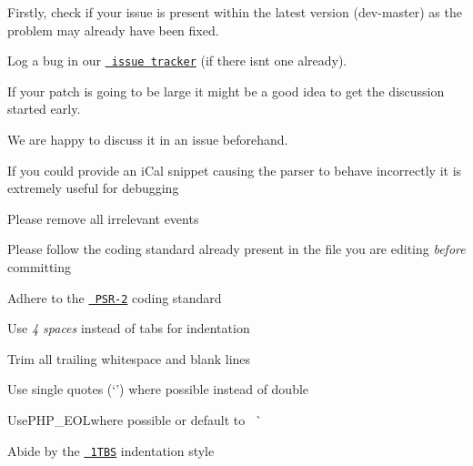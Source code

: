 \begin{DoxyEnumerate}
\item Firstly, check if your issue is present within the latest version ({\ttfamily dev-\/master}) as the problem may already have been fixed.
\end{DoxyEnumerate}
\begin{DoxyEnumerate}
\item Log a bug in our \href{https://github.com/u01jmg3/ics-parser/issues}{\texttt{ issue tracker}} (if there isn\textquotesingle{}t one already).
\begin{DoxyItemize}
\item If your patch is going to be large it might be a good idea to get the discussion started early.
\begin{DoxyItemize}
\item We are happy to discuss it in an issue beforehand.
\end{DoxyItemize}
\item If you could provide an i\+Cal snippet causing the parser to behave incorrectly it is extremely useful for debugging
\begin{DoxyItemize}
\item Please remove all irrelevant events
\end{DoxyItemize}
\end{DoxyItemize}
\end{DoxyEnumerate}
\begin{DoxyEnumerate}
\item Please follow the coding standard already present in the file you are editing {\itshape before} committing
\begin{DoxyItemize}
\item Adhere to the \href{https://github.com/php-fig/fig-standards/blob/master/accepted/PSR-2-coding-style-guide.md}{\texttt{ PSR-\/2}} coding standard
\item Use {\itshape 4 spaces} instead of tabs for indentation
\item Trim all trailing whitespace and blank lines
\item Use single quotes (`'{\ttfamily ) where possible instead of double}
\item {\ttfamily Use}PHP\+\_\+\+EOL{\ttfamily where possible or default to}~\newline
\`{}
\item Abide by the \href{https://en.wikipedia.org/wiki/Indent_style\#Variant:_1TBS_.28OTBS.29}{\texttt{ 1TBS}} indentation style 
\end{DoxyItemize}
\end{DoxyEnumerate}